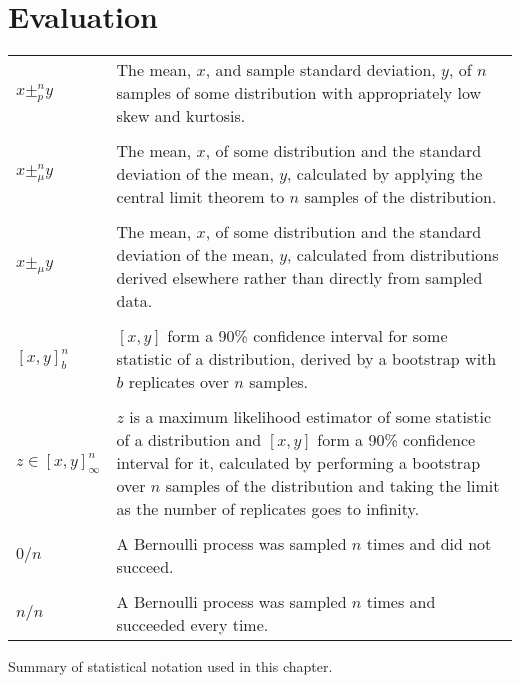 \newcommand{\biggraph}[1]{}

\chapter{Evaluation}
\label{chapter:eval}

\begin{sanefig}
  \begin{tabular}{lp{12.7cm}}
    $x \pm^n_p y$ & The mean, $x$, and sample standard deviation, $y$, of $n$ samples of some distribution with appropriately low skew and kurtosis.\\
    & \\
    $x \pm^n_\mu y$ & The mean, $x$, of some distribution and the standard deviation of the mean, $y$, calculated by applying the central limit theorem to $n$ samples of the distribution.\\
    & \\
    $x \pm_\mu y$ & The mean, $x$, of some distribution and the standard deviation of the mean, $y$, calculated from distributions derived elsewhere rather than directly from sampled data.\\
    & \\
    $[x,y]^n_b$ & $[x,y]$ form a 90\% confidence interval for some statistic of a distribution, derived by a bootstrap with $b$ replicates over $n$ samples. \\
    & \\
    $z \in [x,y]^n_\infty$ & $z$ is a maximum likelihood estimator of some statistic of a distribution and $[x,y]$ form a 90\% confidence interval for it, calculated by performing a bootstrap over $n$ samples of the distribution and taking the limit as the number of replicates goes to infinity.\\
    & \\
    $0/n$ & A Bernoulli process was sampled $n$ times and did not succeed. \\
    &\\
    $n/n$ & A Bernoulli process was sampled $n$ times and succeeded every time. \\
  \end{tabular}
  \caption{Summary of statistical notation used in this chapter.}
\end{sanefig}

